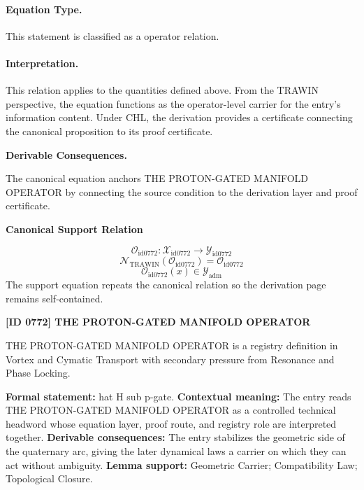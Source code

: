 \paragraph{Equation Type.}
This statement is classified as a operator relation.

\paragraph{Interpretation.}
This relation applies to the quantities defined above. From the TRAWIN perspective, the equation functions as the operator-level carrier for the entry’s information content. Under CHL, the derivation provides a certificate connecting the canonical proposition to its proof certificate.

\par\vspace{0.35em}
\noindent\textbf{Derivable Consequences.}\quad
\begingroup
\footnotesize
\raggedright
The canonical equation anchors THE PROTON-GATED MANIFOLD OPERATOR by connecting the source condition to the derivation layer and proof certificate.
\par\endgroup

\noindent\textbf{Canonical Support Relation}\par
\[
\mathcal{O}_{\mathrm{id0772}}:\mathcal{X}_{\mathrm{id0772}}\longrightarrow\mathcal{Y}_{\mathrm{id0772}}
\]
\[
\mathcal{N}_{\mathrm{TRAWIN}}(\mathcal{O}_{\mathrm{id0772}})=\mathcal{O}_{\mathrm{id0772}}
\]
\[
\mathcal{O}_{\mathrm{id0772}}(x)\in\mathcal{Y}_{\mathrm{adm}}
\]
\noindent The support equation repeats the canonical relation so the derivation page remains self-contained.\par

\clearpage
\noindent\textbf{[ID 0772] THE PROTON-GATED MANIFOLD OPERATOR}\par
\vspace{0.35em}
\begingroup\small
{}
THE PROTON-GATED MANIFOLD OPERATOR is a registry definition in Vortex and Cymatic Transport with secondary pressure from Resonance and Phase Locking.

\begingroup\footnotesize\setlength{\emergencystretch}{3em}\sloppy
\textbf{Formal statement:} hat H sub p-gate. \textbf{Contextual meaning:} The entry reads THE PROTON-GATED MANIFOLD OPERATOR as a controlled technical headword whose equation layer, proof route, and registry role are interpreted together. \textbf{Derivable consequences:} The entry stabilizes the geometric side of the quaternary arc, giving the later dynamical laws a carrier on which they can act without ambiguity. \textbf{Lemma support:} Geometric Carrier; Compatibility Law; Topological Closure.\par
\endgroup

